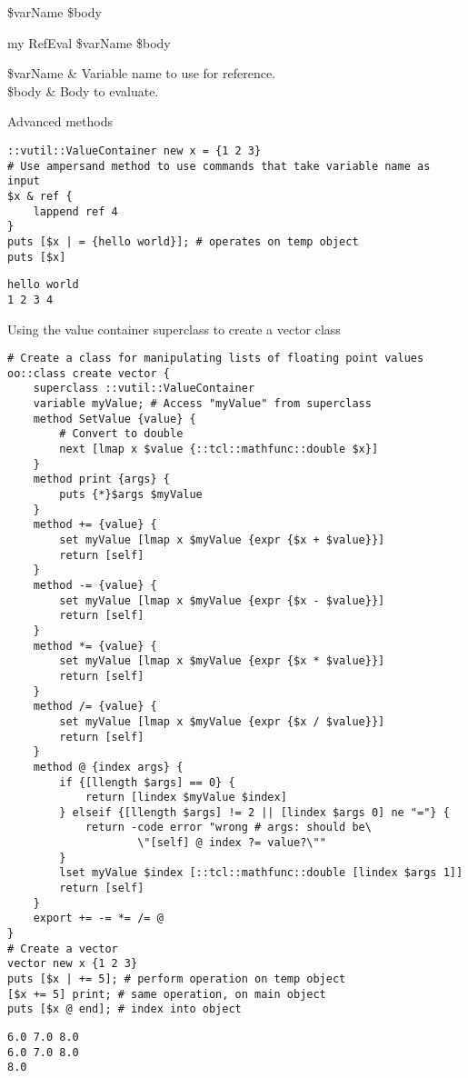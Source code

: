 \documentclass{article}
\begin{document}
\begin{syntax}
 \$varName \$body
\end{syntax}
\begin{syntax}
my RefEval \$varName \$body
\end{syntax}
\begin{args}
\$varName & Variable name to use for reference. \\
\$body & Body to evaluate.
\end{args}
\begin{example}{Advanced methods}
\begin{lstlisting}
::vutil::ValueContainer new x = {1 2 3}
# Use ampersand method to use commands that take variable name as input
$x & ref {
    lappend ref 4
}
puts [$x | = {hello world}]; # operates on temp object
puts [$x]
\end{lstlisting}
\tcblower
\begin{lstlisting}
hello world
1 2 3 4
\end{lstlisting}
\end{example}

\clearpage
\begin{example}{Using the value container superclass to create a vector class}
\begin{lstlisting}
# Create a class for manipulating lists of floating point values
oo::class create vector {
    superclass ::vutil::ValueContainer
    variable myValue; # Access "myValue" from superclass
    method SetValue {value} {
        # Convert to double
        next [lmap x $value {::tcl::mathfunc::double $x}]
    }
    method print {args} {
        puts {*}$args $myValue
    }
    method += {value} {
        set myValue [lmap x $myValue {expr {$x + $value}}]
        return [self]
    }
    method -= {value} {
        set myValue [lmap x $myValue {expr {$x - $value}}]
        return [self]
    }
    method *= {value} {
        set myValue [lmap x $myValue {expr {$x * $value}}]
        return [self]
    }
    method /= {value} {
        set myValue [lmap x $myValue {expr {$x / $value}}]
        return [self]
    }
    method @ {index args} {
        if {[llength $args] == 0} {
            return [lindex $myValue $index]
        } elseif {[llength $args] != 2 || [lindex $args 0] ne "="} {
            return -code error "wrong # args: should be\
                    \"[self] @ index ?= value?\""
        }
        lset myValue $index [::tcl::mathfunc::double [lindex $args 1]]
        return [self]
    }
    export += -= *= /= @
}
# Create a vector
vector new x {1 2 3}
puts [$x | += 5]; # perform operation on temp object
[$x += 5] print; # same operation, on main object
puts [$x @ end]; # index into object
\end{lstlisting}
\tcblower
\begin{lstlisting}
6.0 7.0 8.0
6.0 7.0 8.0
8.0
\end{lstlisting}
\end{example}

\printindex
\end{document}
